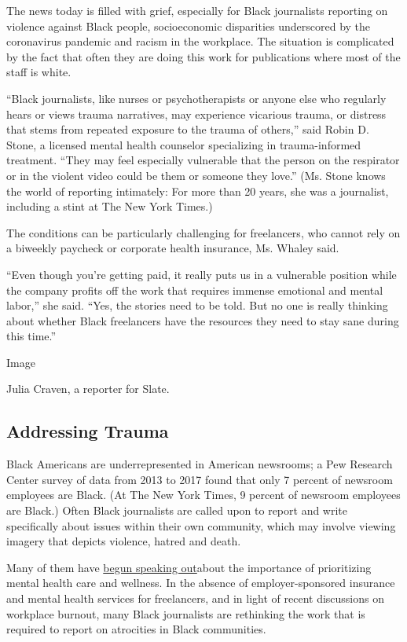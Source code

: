 The news today is filled with grief, especially for Black journalists
reporting on violence against Black people, socioeconomic disparities
underscored by the coronavirus pandemic and racism in the workplace. The
situation is complicated by the fact that often they are doing this work
for publications where most of the staff is white.

``Black journalists, like nurses or psychotherapists or anyone else who
regularly hears or views trauma narratives, may experience vicarious
trauma, or distress that stems from repeated exposure to the trauma of
others,'' said Robin D. Stone, a licensed mental health counselor
specializing in trauma-informed treatment. ``They may feel especially
vulnerable that the person on the respirator or in the violent video
could be them or someone they love.'' (Ms. Stone knows the world of
reporting intimately: For more than 20 years, she was a journalist,
including a stint at The New York Times.)

The conditions can be particularly challenging for freelancers, who
cannot rely on a biweekly paycheck or corporate health insurance, Ms.
Whaley said.

``Even though you're getting paid, it really puts us in a vulnerable
position while the company profits off the work that requires immense
emotional and mental labor,'' she said. ``Yes, the stories need to be
told. But no one is really thinking about whether Black freelancers have
the resources they need to stay sane during this time.''

Image

Julia Craven, a reporter for Slate.

\hypertarget{addressing-trauma}{%
\subsection{Addressing Trauma}\label{addressing-trauma}}

Black Americans are underrepresented in American newsrooms; a Pew
Research Center survey of data from 2013 to 2017 found that only 7
percent of newsroom employees are Black. (At The New York Times, 9
percent of newsroom employees are Black.) Often Black journalists are
called upon to report and write specifically about issues within their
own community, which may involve viewing imagery that depicts violence,
hatred and death.

Many of them have
\href{https://www.huffpost.com/entry/black-journalists-media-reckoning-coronavirus-protests_n_5f0886d5c5b67a80bc06c683?guccounter=1\&guce_referrer=aHR0cHM6Ly90LmNvL1llVXE1a2dZU3A_YW1wPTE\&guce_referrer_sig=AQAAAI-nT8EfHpllwL0NGE4Zp1KVkb-NaJhDUuKhopPe-9QqpGJCUC1plFEkJU9HV1twl47KO7XZ4lFAMlimSMiCkj4VykYT1hwmBCiQrAX0C6YK8rthWkoOvToTXia8FxjwdzPSs6aeGEKhtO-ABcsLUrgk7hjEdw774SNGdW_ax_ba}{begun
speaking out}about the importance of prioritizing mental health care and
wellness. In the absence of employer-sponsored insurance and mental
health services for freelancers, and in light of recent discussions on
workplace burnout, many Black journalists are rethinking the work that
is required to report on atrocities in Black communities.

